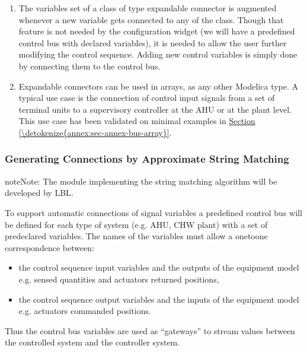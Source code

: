 \documentclass[letterpaper,10pt, openany,english]{sphinxmanual}
\begin{document}
\begin{enumerate}
\item {} 
The variables set of a class of type expandable connector is augmented whenever a new variable gets connected to any  of the class. Though that feature is not needed by the configuration widget (we will have a predefined control bus with declared variables), it is needed to allow the user further modifying the control sequence. Adding new control variables is simply done by connecting them to the control bus.

\item {} 
Expandable connectors can be used in arrays, as any other Modelica type. A typical use case is the connection of control input signals from a set of terminal units to a supervisory controller at the AHU or at the plant level. This use case has been validated on minimal examples in \hyperref[\detokenize{annex:sec-annex-bus-array}]{Section \ref{\detokenize{annex:sec-annex-bus-array}}}.

\end{enumerate}


\subsubsection{Generating Connections by Approximate String Matching}
\label{\detokenize{requirements:generating-connections-by-approximate-string-matching}}
\begin{sphinxadmonition}{note}{Note:}
The module implementing the string matching algorithm will be developed by LBL.
\end{sphinxadmonition}

To support automatic connections of signal variables a predefined control bus will be defined for each type of system (e.g. AHU, CHW plant) with a set of predeclared variables. The names of the variables must allow a one\sphinxhyphen{}to\sphinxhyphen{}one correspondence between:
\begin{itemize}
\item {} 
the control sequence input variables and the outputs of the equipment model e.g. sensed quantities and actuators returned positions,

\item {} 
the control sequence output variables and the inputs of the equipment model e.g. actuators commanded positions.

\end{itemize}

Thus the control bus variables are used as “gateways” to stream values between the controlled system and the controller system.
\end{document}

